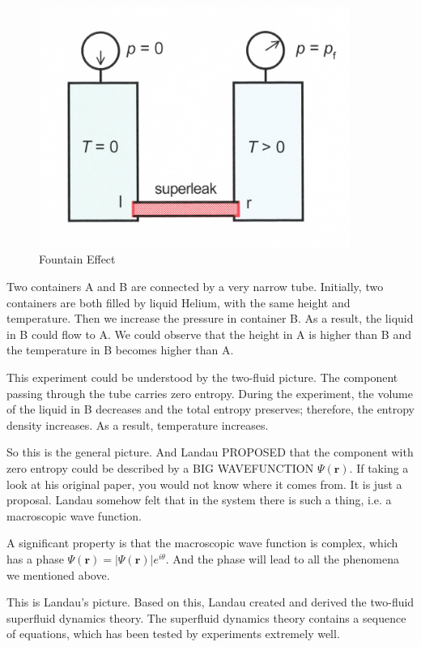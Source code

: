 \begin{figure}[htbp]
\centering
\includegraphics[width=4in]{image/ch1/1-3-fountain.pdf} 
\caption{Fountain Effect}
\label{fig:1-3}
\end{figure}

Two containers A and B are connected by a very narrow tube. Initially, two containers are both filled by liquid Helium, with the same height and temperature. Then we increase the pressure in container B. As a result, the liquid in B could flow to A. We could observe that the height in A is higher than B and the temperature in B becomes higher than A.

This experiment could be understood by the two-fluid picture. The component passing through the tube carries zero entropy. During the experiment, the volume of the liquid in B decreases and the total entropy preserves; therefore, the entropy density increases. As a result, temperature increases.

So this is the general picture. And Landau PROPOSED that the component with zero entropy could be described by a BIG WAVEFUNCTION $\Psi(\bm r)$. If taking a look at his original paper, you would not know where it comes from. It is just a proposal. Landau somehow felt that in the system there is such a thing, i.e. a macroscopic wave function. 

A significant property is that the macroscopic wave function is complex, which has a phase $\Psi(\bm r)= |\Psi(\bm r)|e^{i\theta}$. And the phase will lead to all the phenomena we mentioned above.

This is Landau's picture. Based on this, Landau created and derived the two-fluid superfluid dynamics theory. The superfluid dynamics theory contains a sequence of equations, which has been tested by experiments extremely well.

